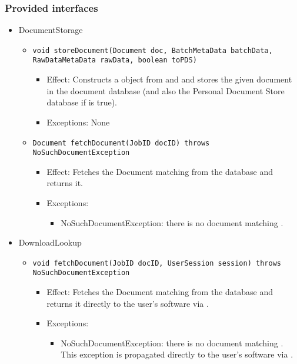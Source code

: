 \subsubsection*{Provided interfaces}
\begin{itemize}
	\item DocumentStorage
	\begin{itemize}
		\item \texttt{void storeDocument(Document doc, BatchMetaData batchData, RawDataMetaData rawData, boolean toPDS)}
		\begin{itemize}
			\item Effect: Constructs a  object from  and  and stores the given document in the document database (and also the Personal Document Store database if  is true).
			\item Exceptions: None
		\end{itemize}
		
		\item \texttt{Document fetchDocument(JobID docID) throws NoSuchDocumentException}
		\begin{itemize}
			\item Effect: Fetches the Document matching  from the database and returns it.
			\item Exceptions: 
			\begin{itemize}
				\item NoSuchDocumentException: there is no document matching .
			\end{itemize}
		\end{itemize}
	\end{itemize}
	
	\item DownloadLookup
	\begin{itemize}
		\item \texttt{void fetchDocument(JobID docID, UserSession session) throws NoSuchDocumentException}
		\begin{itemize}
			\item Effect: Fetches the Document matching  from the database and returns it directly to the user's software via .
			\item Exceptions:
			\begin{itemize}
				\item NoSuchDocumentException: there is no document matching . This exception is propagated directly to the user's software via .
			\end{itemize}
		\end{itemize}
	\end{itemize}
	

\end{itemize}
